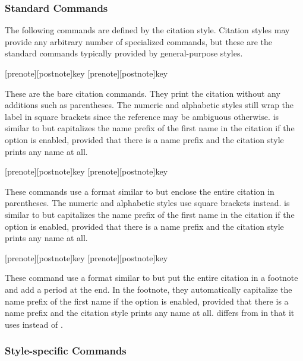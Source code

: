 \documentclass{ltxdockit}[2011/03/25]
\begin{document}
\subsubsection{Standard Commands}
\label{use:cit:std}

The following commands are defined by the citation style. Citation styles may provide any arbitrary number of specialized commands, but these are the standard commands typically provided by general-purpose styles.

\begin{ltxsyntax}

[prenote][postnote]{key}
[prenote][postnote]{key}

These are the bare citation commands. They print the citation without any additions such as parentheses. The numeric and alphabetic styles still wrap the label in square brackets since the reference may be ambiguous otherwise.  is similar to  but capitalizes the name prefix of the first name in the citation if the  option is enabled, provided that there is a name prefix and the citation style prints any name at all.

[prenote][postnote]{key}
[prenote][postnote]{key}

These commands use a format similar to  but enclose the entire citation in parentheses. The numeric and alphabetic styles use square brackets instead.  is similar to  but capitalizes the name prefix of the first name in the citation if the  option is enabled, provided that there is a name prefix and the citation style prints any name at all.

[prenote][postnote]{key}
[prenote][postnote]{key}

These command use a format similar to  but put the entire citation in a footnote and add a period at the end. In the footnote, they automatically capitalize the name prefix of the first name if the  option is enabled, provided that there is a name prefix and the citation style prints any name at all.  differs from  in that it uses  instead of .

\end{ltxsyntax}

\subsubsection{Style-specific Commands}
\label{use:cit:cbx}
\end{document}
